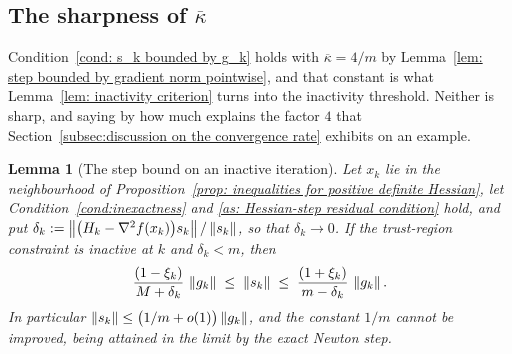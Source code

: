 \documentclass[11pt]{article}
\theoremstyle{plain}
\newtheorem{lemma}[theorem]{Lemma}
\theoremstyle{definition}
\theoremstyle{remark}
\numberwithin{equation}{section}
\providecommand{\defeq}{\mathrel{:=}}
\providecommand{\kbar}{\overline{\kappa}}
\providecommand{\kbar}{\overline{\kappa}}
\begin{document}

\subsection{The sharpness of \texorpdfstring{$\kbar$}{kappa-bar}}
\label{subsec: sharpness of kbar}

Condition~\ref{cond: s_k bounded by g_k} holds with $\kbar = 4/m$ by
Lemma~\ref{lem: step bounded by gradient norm pointwise}, and that constant is what
Lemma~\ref{lem: inactivity criterion} turns into the inactivity threshold. Neither is sharp, and
saying by how much explains the factor $4$ that
Section~\ref{subsec:discussion on the convergence rate} exhibits on an example.

\begin{lemma}[The step bound on an inactive iteration]
\label{lem: sharp step bound}
    Let $x_k$ lie in the neighbourhood of
    Proposition~\ref{prop: inequalities for positive definite Hessian}, let
    Condition~\ref{cond:inexactness} and \ref{as: Hessian-step residual condition} hold, and put
    $\delta_k \defeq \norm{\bigl(H_k - \nabla^2 f(x_k)\bigr)s_k}/\norm{s_k}$, so that
    $\delta_k \to 0$. If the trust-region constraint is inactive at $k$ and $\delta_k < m$, then
    \begin{equation}
        \frac{(1-\xi_k)}{M + \delta_k}\,\left \lVert g_k \right \rVert
        \;\leq\; \left \lVert s_k \right \rVert \;\leq\;
        \frac{(1+\xi_k)}{m - \delta_k}\,\left \lVert g_k \right \rVert .
        \label{eqn: sharp step bound}
    \end{equation}
    In particular $\left \lVert s_k \right \rVert \leq \bigl(1/m + o(1)\bigr)\left \lVert g_k \right \rVert$, and the constant $1/m$
    cannot be improved, being attained in the limit by the exact Newton step.
\end{lemma}
\end{document}
